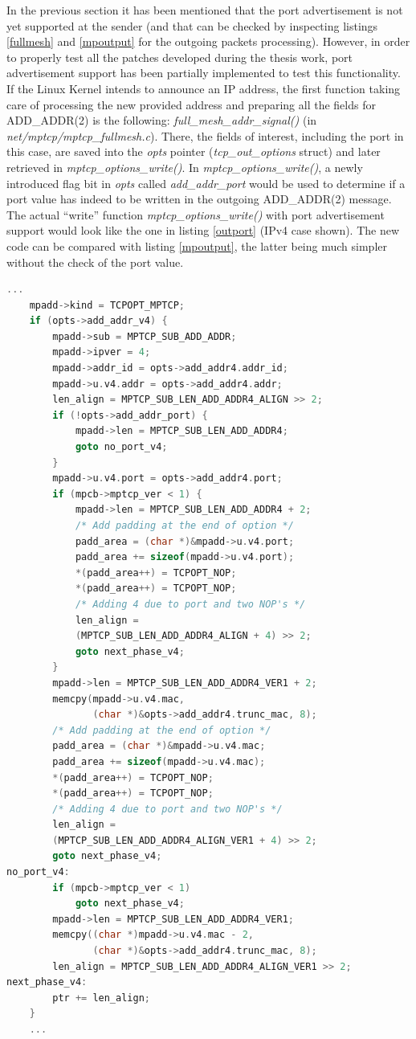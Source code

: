 In the previous section it has been mentioned that the port advertisement is not yet supported at the sender (and that can be checked by inspecting listings \ref{fullmesh} and \ref{mpoutput} for the outgoing packets processing).
However, in order to properly test all the patches developed during the thesis work, port advertisement support has been partially implemented to test this functionality. If the Linux Kernel intends to announce an IP address, the first function taking care of processing the new provided address and preparing all the fields for ADD\_ADDR(2) is the following: \textit{full\_mesh\_addr\_signal()} (in \textit{net/mptcp/mptcp\_fullmesh.c}). There, the fields of interest, including the port in this case, are saved into the \textit{opts} pointer (\textit{tcp\_out\_options} struct) and later retrieved in \textit{mptcp\_options\_write()}. In \textit{mptcp\_options\_write()}, a newly introduced flag bit in \textit{opts} called \textit{add\_addr\_port} would be used to determine if a port value has indeed to be written in the outgoing ADD\_ADDR(2) message. The actual ``write'' function \textit{mptcp\_options\_write()} with port advertisement support would look like the one in listing \ref{outport} (IPv4 case shown). The new code can be compared with listing \ref{mpoutput}, the latter being much simpler without the check of the port value.

\begin{lstlisting}[language=c, caption=Code to build the outgoing ADD\_ADDR(2) packet with added support for the port value, label=outport]
	...
	mpadd->kind = TCPOPT_MPTCP;
	if (opts->add_addr_v4) {
		mpadd->sub = MPTCP_SUB_ADD_ADDR;
		mpadd->ipver = 4;
		mpadd->addr_id = opts->add_addr4.addr_id;
		mpadd->u.v4.addr = opts->add_addr4.addr;
		len_align = MPTCP_SUB_LEN_ADD_ADDR4_ALIGN >> 2;
		if (!opts->add_addr_port) {
			mpadd->len = MPTCP_SUB_LEN_ADD_ADDR4;
			goto no_port_v4;
		}
		mpadd->u.v4.port = opts->add_addr4.port;
		if (mpcb->mptcp_ver < 1) {
			mpadd->len = MPTCP_SUB_LEN_ADD_ADDR4 + 2;
			/* Add padding at the end of option */
			padd_area = (char *)&mpadd->u.v4.port;
			padd_area += sizeof(mpadd->u.v4.port);
			*(padd_area++) = TCPOPT_NOP;
			*(padd_area++) = TCPOPT_NOP;
			/* Adding 4 due to port and two NOP's */
			len_align =
			(MPTCP_SUB_LEN_ADD_ADDR4_ALIGN + 4) >> 2;
			goto next_phase_v4;
		}
		mpadd->len = MPTCP_SUB_LEN_ADD_ADDR4_VER1 + 2;
		memcpy(mpadd->u.v4.mac,
		       (char *)&opts->add_addr4.trunc_mac, 8);
		/* Add padding at the end of option */
		padd_area = (char *)&mpadd->u.v4.mac;
		padd_area += sizeof(mpadd->u.v4.mac);
		*(padd_area++) = TCPOPT_NOP;
		*(padd_area++) = TCPOPT_NOP;
		/* Adding 4 due to port and two NOP's */
		len_align =
		(MPTCP_SUB_LEN_ADD_ADDR4_ALIGN_VER1 + 4) >> 2;
		goto next_phase_v4;
no_port_v4:
		if (mpcb->mptcp_ver < 1)
			goto next_phase_v4;
		mpadd->len = MPTCP_SUB_LEN_ADD_ADDR4_VER1;
		memcpy((char *)mpadd->u.v4.mac - 2,
		       (char *)&opts->add_addr4.trunc_mac, 8);
		len_align = MPTCP_SUB_LEN_ADD_ADDR4_ALIGN_VER1 >> 2;
next_phase_v4:
		ptr += len_align;
	}
	...
\end{lstlisting}

